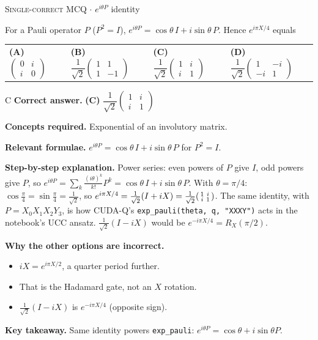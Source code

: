 \documentclass[11pt,a4paper]{article}
\newcommand{\optlabel}[1]{\textbf{(#1)}}
\newcommand{\correctlabel}[1]{\textcolor{okgreen}{\textbf{(#1)}\,\ding{51}}}
\newenvironment{qitem}[1]{\begin{list}{}{\setlength{\leftmargin}{3.3em}\setlength{\labelwidth}{3.1em}%
  \setlength{\labelsep}{0.2em}\setlength{\topsep}{3pt}\setlength{\parsep}{3pt}}\item[\textbf{Q.#1}\hfill]}{\end{list}}
\newcommand{\qmeta}[2]{{\footnotesize\color{black!60}\textsc{#1} \;$\cdot$\; #2}\par}
\begin{document}
\begin{qitem}{13}
\qmeta{Single-correct MCQ}{$e^{i\theta P}$ identity}
For a Pauli operator $P$ ($P^2 = I$), $e^{i\theta P} = \cos\theta\,I + i\sin\theta\,P$. Hence $e^{i\pi X/4}$ equals
\par\smallskip\noindent\begin{tabularx}{\linewidth}{@{}*{4}{L}@{}}
\optlabel{A}\,$\begin{pmatrix}0 & i\\ i & 0\end{pmatrix}$ & \optlabel{B}\,$\dfrac{1}{\sqrt2}\begin{pmatrix}1 & 1\\ 1 & -1\end{pmatrix}$ & \correctlabel{C}\,$\dfrac{1}{\sqrt2}\begin{pmatrix}1 & i\\ i & 1\end{pmatrix}$ & \optlabel{D}\,$\dfrac{1}{\sqrt2}\begin{pmatrix}1 & -i\\ -i & 1\end{pmatrix}$
\end{tabularx}
\end{qitem}
\begin{solbox}{C}
\textbf{\color{brand}Correct answer.} \textcolor{okgreen}{\textbf{(C)}} $\dfrac{1}{\sqrt2}\begin{pmatrix}1 & i\\ i & 1\end{pmatrix}$

\textbf{\color{brand}Concepts required.} Exponential of an involutory matrix.

\textbf{\color{brand}Relevant formulae.} $e^{i\theta P} = \cos\theta\,I + i\sin\theta\,P$ for $P^2 = I$.

\textbf{\color{brand}Step-by-step explanation.} Power series: even powers of $P$ give $I$, odd powers give $P$, so $e^{i\theta P} = \sum_k\frac{(i\theta)^k}{k!}P^k = \cos\theta\,I + i\sin\theta\,P$.
With $\theta = \pi/4$: $\cos\frac\pi4 = \sin\frac\pi4 = \frac{1}{\sqrt2}$, so $e^{i\pi X/4} = \frac{1}{\sqrt2}(I + iX) = \frac{1}{\sqrt2}\begin{psmallmatrix}1 & i\\ i & 1\end{psmallmatrix}$.
The same identity, with $P = X_0X_1X_2Y_3$, is how CUDA-Q's \texttt{exp\_pauli(theta, q, "XXXY")} acts in the notebook's UCC ansatz.
$\frac{1}{\sqrt2}(I - iX)$ would be $e^{-i\pi X/4} = R_X(\pi/2)$.

\textbf{\color{brand}Why the other options are incorrect.}
\begin{itemize}[leftmargin=2.4em, itemsep=1pt, topsep=2pt]
\item[\textbf{(A)}] $iX = e^{i\pi X/2}$, a quarter period further.
\item[\textbf{(B)}] That is the Hadamard gate, not an $X$ rotation.
\item[\textbf{(D)}] $\frac{1}{\sqrt2}(I - iX)$ is $e^{-i\pi X/4}$ (opposite sign).
\end{itemize}
\textbf{\color{brand}Key takeaway.} Same identity powers \texttt{exp\_pauli}: $e^{i\theta P} = \cos\theta + i\sin\theta P$.
\end{solbox}
\end{document}
